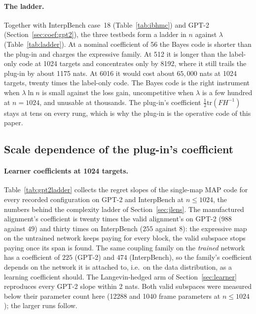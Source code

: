 \documentclass[11pt,a4paper]{article}
\begin{document}
\paragraph{The ladder.} Together with InterpBench case~18 (Table~\ref{tab:ibhmc}) and GPT-2 (Section~\ref{sec:coef:gpt2}), the three testbeds form a ladder in $n$ against $\lambda$ (Table~\ref{tab:ladder}). At a nominal coefficient of 56 the Bayes code is shorter than the plug-in and charges the expressive family. At 512 it is longer than the label-only code at 1024 targets and concentrates only by 8192, where it still trails the plug-in by about 1175 nats. At 6016 it would cost about $65{,}000$ nats at 1024 targets, twenty times the label-only code. The Bayes code is the right instrument when $\lambda\ln n$ is small against the loss gain, uncompetitive when $\lambda$ is a few hundred at $n=1024$, and unusable at thousands. The plug-in's coefficient $\tfrac12\mathrm{tr}(FH^{-1})$ stays at tens on every rung, which is why the plug-in is the operative code of this paper.

\subsection{Scale dependence of the plug-in's coefficient}
\label{sec:coef:scale}

\paragraph{Learner coefficients at 1024 targets.} Table~\ref{tab:gpt2ladder} collects the regret slopes of the single-map MAP code for every recorded configuration on GPT-2 and InterpBench at $n\le1024$, the numbers behind the complexity ladder of Section~\ref{sec:jlens}. The manufactured alignment's coefficient is twenty times the valid alignment's on GPT-2 ($988$ against $49$) and thirty times on InterpBench ($255$ against $8$): the expressive map on the untrained network keeps paying for every block, the valid subspace stops paying once its span is found. The same coupling family on the \emph{trained} network has a coefficient of $225$ (GPT-2) and $474$ (InterpBench), so the family's coefficient depends on the network it is attached to, i.e.\ on the data distribution, as a learning coefficient should. The Langevin-hedged arm of Section~\ref{sec:learner} reproduces every GPT-2 slope within 2 nats. Both valid subspaces were measured below their parameter count here (12288 and 1040 frame parameters at $n\le1024$); the larger runs follow.
\end{document}
